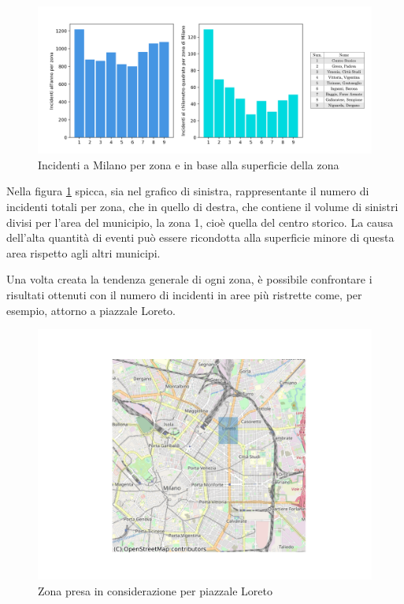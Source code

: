 \documentclass[a4paper,12pt]{report}
\begin{document}
\begin{figure}
    \includegraphics[width=\linewidth]{../src/municipi_milano/incidenti_superf.png}
    \caption{Incidenti a Milano per zona e in base alla superficie della zona}
    \label{fig:incidenti-chilometro}
\end{figure}

Nella figura \ref{fig:incidenti-chilometro} spicca, sia nel grafico di sinistra, rappresentante 
il numero di incidenti totali per zona, che in 
quello di destra, che contiene il volume di sinistri divisi per l'area del municipio, 
la zona 1, cioè quella del centro storico. 
La causa dell'alta quantità di eventi può essere ricondotta alla superficie minore 
di questa area rispetto agli altri municipi. 

Una volta creata la tendenza generale di ogni zona, è possibile confrontare i risultati 
ottenuti con il numero di incidenti in aree più ristrette come, per esempio, 
attorno a piazzale Loreto. 

\begin{figure}
    \hfill\includegraphics[width=0.7\linewidth]{../src/municipi_milano/zona_loreto.png}\hspace*{\fill}
    \caption{Zona presa in considerazione per piazzale Loreto}
    \label{fig:zona-loreto}
\end{figure}
\end{document}
